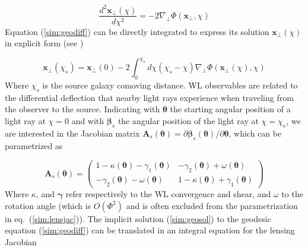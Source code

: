 \documentclass[reprint,aps,prd,superscriptaddress,showkeys,showpacs]{revtex4-1}
\newcommand{\bb}[1]{\mathbf{#1}}
\newcommand\pt{\pmb{\theta}}
\begin{document}
\begin{equation}
\label{sim:geodiff}
\frac{d^2 \bb{x}_\perp(\chi)}{d\chi^2} = -2\nabla_\perp \Phi(\bb{x}_\perp,\chi)
\end{equation}
%
Equation (\ref{sim:geodiff}) can be directly integrated to express its solution $\bb{x}_\perp(\chi)$ in explicit form (see \citep{DodelsonWL}) 

\begin{equation}
\label{sim:geosol}
\bb{x}_\perp(\chi_s) = \bb{x}_\perp(0) -2\int_0^{\chi_s} d\chi (\chi_s-\chi) \nabla_\perp \Phi(\bb{x}_\perp(\chi),\chi)
\end{equation}
%
Where $\chi_s$ is the source galaxy comoving distance. WL observables are related to the differential deflection that nearby light rays experience when traveling from the observer to the source. Indicating with $\pt$ the starting angular position of a light ray at $\chi=0$ and with $\pmb{\beta}_s$ the angular position of the light ray at $\chi=\chi_s$, we are interested in the Jacobian matrix $\bb{A}_s(\pt)=\partial\pmb{\beta}_s(\pt)/\partial \pt$, which can be parametrized as 

\begin{equation}
\label{sim:lensjac}
\bb{A}_s(\pt) = 
\begin{pmatrix}
%
1-\kappa(\pt)-\gamma_1(\pt) & -\gamma_2(\pt) + \omega(\pt) \\
-\gamma_2(\pt) - \omega(\pt) & 1-\kappa(\pt)+\gamma_1(\pt)
\end{pmatrix}
\end{equation}
%
Where $\kappa$, and $\pmb{\gamma}$ refer respectively to the WL
convergence and shear, and $\omega$ to the rotation angle (which is
$O(\Phi^2)$ and is often excluded from the parametrization in eq.~(\ref{sim:lensjac})).  The implicit solution
(\ref{sim:geosol}) to the geodesic equation (\ref{sim:geodiff}) can be
translated in an integral equation for the lensing Jacobian
\end{document}
